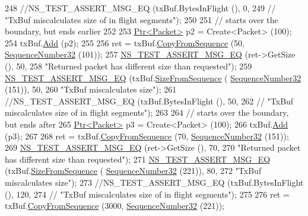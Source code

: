 \begin{DoxyCode}
248   \textcolor{comment}{//NS\_TEST\_ASSERT\_MSG\_EQ (txBuf.BytesInFlight (), 0,}
249   \textcolor{comment}{//                       "TxBuf miscalculates size of in flight segments");}
250 
251   \textcolor{comment}{// starts over the boundary, but ends earlier}
252 
253   \hyperlink{classns3_1_1Ptr}{Ptr<Packet>} p2 = Create<Packet> (100);
254   txBuf.\hyperlink{classns3_1_1TcpTxBuffer_a275d96f2c58333c9e7c5fe0f1fa152e1}{Add} (p2);
255 
256   ret = txBuf.\hyperlink{classns3_1_1TcpTxBuffer_a5eb9c889cfad2cd11a5ccf996c506fd3}{CopyFromSequence} (50, \hyperlink{classns3_1_1SequenceNumber}{SequenceNumber32} (101));
257   \hyperlink{group__testing_ga2a9d78cffb3db8e867c35fff0b698cf5}{NS\_TEST\_ASSERT\_MSG\_EQ} (ret->GetSize (), 50,
258                          \textcolor{stringliteral}{"Returned packet has different size than requested"});
259   \hyperlink{group__testing_ga2a9d78cffb3db8e867c35fff0b698cf5}{NS\_TEST\_ASSERT\_MSG\_EQ} (txBuf.\hyperlink{classns3_1_1TcpTxBuffer_a6e44c34fdb2c14dcc11dbbe86d8b328a}{SizeFromSequence} (
      \hyperlink{classns3_1_1SequenceNumber}{SequenceNumber32} (151)), 50,
260                          \textcolor{stringliteral}{"TxBuf miscalculates size"});
261   \textcolor{comment}{//NS\_TEST\_ASSERT\_MSG\_EQ (txBuf.BytesInFlight (), 50,}
262   \textcolor{comment}{//                       "TxBuf miscalculates size of in flight segments");}
263 
264   \textcolor{comment}{// starts over the boundary, but ends after}
265   \hyperlink{classns3_1_1Ptr}{Ptr<Packet>} p3 = Create<Packet> (100);
266   txBuf.\hyperlink{classns3_1_1TcpTxBuffer_a275d96f2c58333c9e7c5fe0f1fa152e1}{Add} (p3);
267 
268   ret = txBuf.\hyperlink{classns3_1_1TcpTxBuffer_a5eb9c889cfad2cd11a5ccf996c506fd3}{CopyFromSequence} (70, \hyperlink{classns3_1_1SequenceNumber}{SequenceNumber32} (151));
269   \hyperlink{group__testing_ga2a9d78cffb3db8e867c35fff0b698cf5}{NS\_TEST\_ASSERT\_MSG\_EQ} (ret->GetSize (), 70,
270                          \textcolor{stringliteral}{"Returned packet has different size than requested"});
271   \hyperlink{group__testing_ga2a9d78cffb3db8e867c35fff0b698cf5}{NS\_TEST\_ASSERT\_MSG\_EQ} (txBuf.\hyperlink{classns3_1_1TcpTxBuffer_a6e44c34fdb2c14dcc11dbbe86d8b328a}{SizeFromSequence} (
      \hyperlink{classns3_1_1SequenceNumber}{SequenceNumber32} (221)), 80,
272                          \textcolor{stringliteral}{"TxBuf miscalculates size"});
273   \textcolor{comment}{//NS\_TEST\_ASSERT\_MSG\_EQ (txBuf.BytesInFlight (), 120,}
274   \textcolor{comment}{//                       "TxBuf miscalculates size of in flight segments");}
275 
276   ret = txBuf.\hyperlink{classns3_1_1TcpTxBuffer_a5eb9c889cfad2cd11a5ccf996c506fd3}{CopyFromSequence} (3000, \hyperlink{classns3_1_1SequenceNumber}{SequenceNumber32} (221));

\end{DoxyCode}
